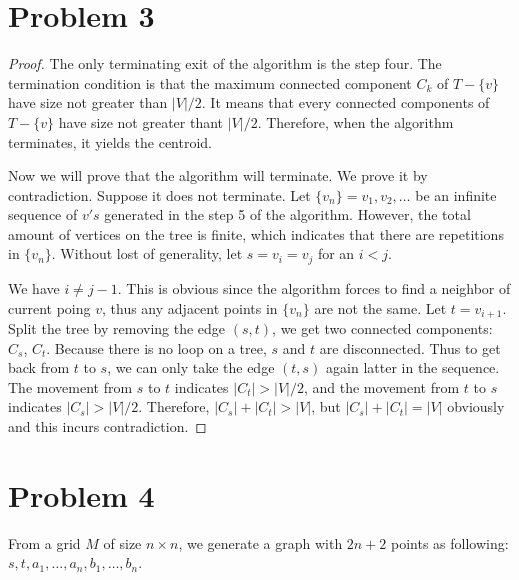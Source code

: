\documentclass{report}
\begin{document}
    \section*{Problem 3}
    \begin{proof}
    The only terminating exit of the algorithm is the step four. The termination condition
    is that the maximum connected component $C_k$ of $T - \{v\}$ have size not greater 
    than $|V| / 2$. It means that every connected components of $T - \{v\}$ have size 
    not greater thant $|V| / 2$. Therefore, when the algorithm terminates, it yields the 
    centroid.

    Now we will prove that the algorithm will terminate. We prove it by contradiction. 
    Suppose it does not terminate. Let $\{v_n\} = v_1, v_2, \ldots$ be an infinite 
    sequence of $v's$ generated in the step 5 of the algorithm. However, the total 
    amount of vertices on the tree is finite, which indicates that there are repetitions
    in $\{v_n\}$. Without lost of generality, let $s = v_i = v_j$ for an $i < j$. 

    We have $i \neq j - 1$. This is obvious since the algorithm forces to find a neighbor 
    of current poing $v$, thus any adjacent points in $\{v_n\}$ are not the same. Let
    $t = v_{i+1}$. Split the tree by removing the edge $(s, t)$, we get two connected components:
    $C_s$, $C_t$. Because there is no loop on a tree, $s$ and $t$ are disconnected. Thus to 
    get back from $t$ to $s$, we can only take the edge $(t, s)$ again latter in the sequence.
    The movement from $s$ to $t$ indicates $|C_t| > |V| / 2$, and the 
    movement from $t$ to $s$ indicates $|C_s| > |V| / 2$. Therefore, $|C_s| + |C_t| > |V|$,
    but $|C_s| + |C_t| = |V|$ obviously and this incurs contradiction.
    \end{proof}

    \section*{Problem 4}
    From a grid $M$ of size $n \times n$, we generate a graph with $2n+2$ points as 
    following: $s, t, a_1, \ldots, a_n, b_1, \ldots, b_n$.
\end{document}
